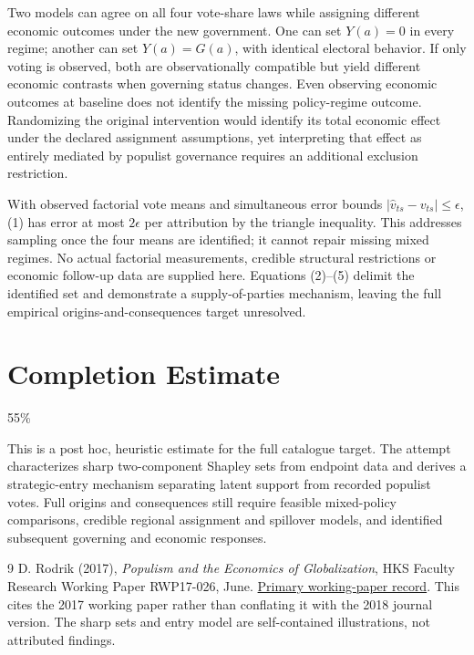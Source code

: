 \documentclass[11pt,a4paper]{article}
\begin{document}
Two models can agree on all four vote-share laws while assigning different economic outcomes under the new government. One can set $Y(a)=0$ in every regime; another can set $Y(a)=G(a)$, with identical electoral behavior. If only voting is observed, both are observationally compatible but yield different economic contrasts when governing status changes. Even observing economic outcomes at baseline does not identify the missing policy-regime outcome. Randomizing the original intervention would identify its total economic effect under the declared assignment assumptions, yet interpreting that effect as entirely mediated by populist governance requires an additional exclusion restriction.

With observed factorial vote means and simultaneous error bounds $|\widehat v_{ts}-v_{ts}|\le\epsilon$, (1) has error at most $2\epsilon$ per attribution by the triangle inequality. This addresses sampling once the four means are identified; it cannot repair missing mixed regimes. No actual factorial measurements, credible structural restrictions or economic follow-up data are supplied here. Equations (2)--(5) delimit the identified set and demonstrate a supply-of-parties mechanism, leaving the full empirical origins-and-consequences target unresolved.

\section{Completion Estimate}
55\%

This is a post hoc, heuristic estimate for the full catalogue target.
The attempt characterizes sharp two-component Shapley sets from endpoint data and derives a strategic-entry mechanism separating latent support from recorded populist votes. Full origins and consequences still require feasible mixed-policy comparisons, credible regional assignment and spillover models, and identified subsequent governing and economic responses.

\begin{thebibliography}{9}
 D. Rodrik (2017), \emph{Populism and the Economics of Globalization}, HKS Faculty Research Working Paper RWP17-026, June. \href{https://www.hks.harvard.edu/publications/populism-and-economics-globalization}{Primary working-paper record}. This cites the 2017 working paper rather than conflating it with the 2018 journal version. The sharp sets and entry model are self-contained illustrations, not attributed findings.
\end{thebibliography}
\end{document}
